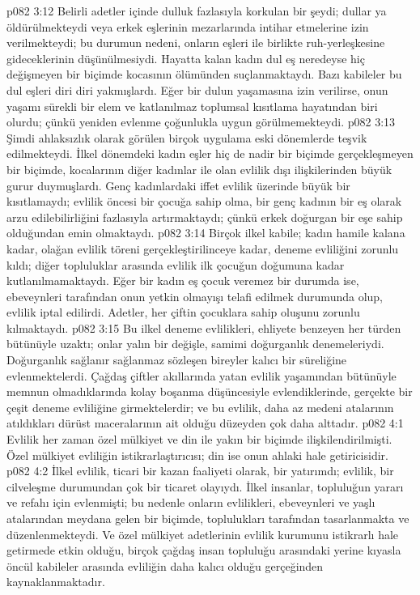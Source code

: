 \vs p082 3:12 Belirli adetler içinde dulluk fazlasıyla korkulan bir şeydi; dullar ya öldürülmekteydi veya erkek eşlerinin mezarlarında intihar etmelerine izin verilmekteydi; bu durumun nedeni, onların eşleri ile birlikte ruh\hyp{}yerleşkesine gideceklerinin düşünülmesiydi. Hayatta kalan kadın dul eş neredeyse hiç değişmeyen bir biçimde kocasının ölümünden suçlanmaktaydı. Bazı kabileler bu dul eşleri diri diri yakmışlardı. Eğer bir dulun yaşamasına izin verilirse, onun yaşamı sürekli bir elem ve katlanılmaz toplumsal kısıtlama hayatından biri olurdu; çünkü yeniden evlenme çoğunlukla uygun görülmemekteydi.
\vs p082 3:13 Şimdi ahlaksızlık olarak görülen birçok uygulama eski dönemlerde teşvik edilmekteydi. İlkel dönemdeki kadın eşler hiç de nadir bir biçimde gerçekleşmeyen bir biçimde, kocalarının diğer kadınlar ile olan evlilik dışı ilişkilerinden büyük gurur duymuşlardı. Genç kadınlardaki iffet evlilik üzerinde büyük bir kısıtlamaydı; evlilik öncesi bir çocuğa sahip olma, bir genç kadının bir eş olarak arzu edilebilirliğini fazlasıyla artırmaktaydı; çünkü erkek doğurgan bir eşe sahip olduğundan emin olmaktaydı.
\vs p082 3:14 Birçok ilkel kabile; kadın hamile kalana kadar, olağan evlilik töreni gerçekleştirilinceye kadar, deneme evliliğini zorunlu kıldı; diğer topluluklar arasında evlilik ilk çocuğun doğumuna kadar kutlanılmamaktaydı. Eğer bir kadın eş çocuk veremez bir durumda ise, ebeveynleri tarafından onun yetkin olmayışı telafi edilmek durumunda olup, evlilik iptal edilirdi. Adetler, her çiftin çocuklara sahip oluşunu zorunlu kılmaktaydı.
\vs p082 3:15 Bu ilkel deneme evlilikleri, ehliyete benzeyen her türden bütünüyle uzaktı; onlar yalın bir değişle, samimi doğurganlık denemeleriydi. Doğurganlık sağlanır sağlanmaz sözleşen bireyler kalıcı bir süreliğine evlenmektelerdi. Çağdaş çiftler akıllarında yatan evlilik yaşamından bütünüyle memnun olmadıklarında kolay boşanma düşüncesiyle evlendiklerinde, gerçekte bir çeşit deneme evliliğine girmektelerdir; ve bu evlilik, daha az medeni atalarının atıldıkları dürüst maceralarının ait olduğu düzeyden çok daha alttadır.
\vs p082 4:1 Evlilik her zaman özel mülkiyet ve din ile yakın bir biçimde ilişkilendirilmişti. Özel mülkiyet evliliğin istikrarlaştırıcısı; din ise onun ahlaki hale getiricisidir.
\vs p082 4:2 İlkel evlilik, ticari bir kazan faaliyeti olarak, bir yatırımdı; evlilik, bir cilveleşme durumundan çok bir ticaret olayıydı. İlkel insanlar, topluluğun yararı ve refahı için evlenmişti; bu nedenle onların evlilikleri, ebeveynleri ve yaşlı atalarından meydana gelen bir biçimde, toplulukları tarafından tasarlanmakta ve düzenlenmekteydi. Ve özel mülkiyet adetlerinin evlilik kurumunu istikrarlı hale getirmede etkin olduğu, birçok çağdaş insan topluluğu arasındaki yerine kıyasla öncül kabileler arasında evliliğin daha kalıcı olduğu gerçeğinden kaynaklanmaktadır.
